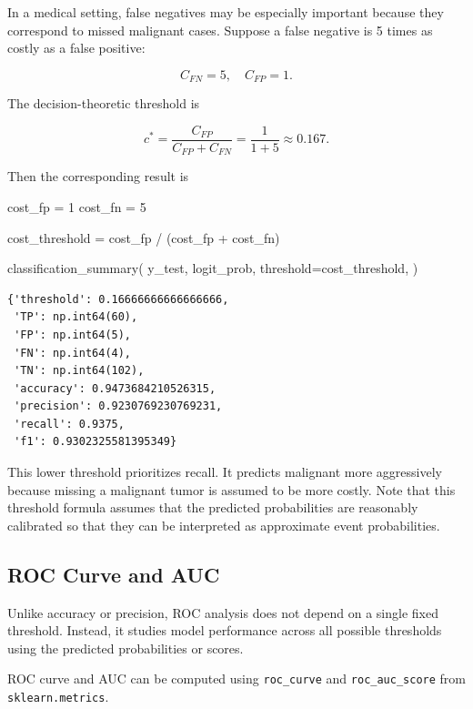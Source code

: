 \documentclass[
  letterpaper,
  DIV=11,
  numbers=noendperiod]{scrreprt}
\newenvironment{Shaded}{\begin{snugshade}}{\end{snugshade}}
\newcommand{\DecValTok}[1]{\textcolor[rgb]{0.68,0.00,0.00}{#1}}
\newcommand{\NormalTok}[1]{\textcolor[rgb]{0.00,0.23,0.31}{#1}}
\newcommand{\OperatorTok}[1]{\textcolor[rgb]{0.37,0.37,0.37}{#1}}
\theoremstyle{definition}
\theoremstyle{definition}
\theoremstyle{plain}
\theoremstyle{plain}
\theoremstyle{remark}
\begin{document}
In a medical setting, false negatives may be especially important
because they correspond to missed malignant cases. Suppose a false
negative is 5 times as costly as a false positive:

\[
C_{FN}=5,
\quad
C_{FP}=1.
\]

The decision-theoretic threshold is

\[
c^*
=
\frac{C_{FP}}{C_{FP}+C_{FN}}
=
\frac{1}{1+5}
\approx
0.167.
\]

Then the corresponding result is

\begin{Shaded}
\begin{Highlighting}[]
\NormalTok{cost\_fp }\OperatorTok{=} \DecValTok{1}
\NormalTok{cost\_fn }\OperatorTok{=} \DecValTok{5}

\NormalTok{cost\_threshold }\OperatorTok{=}\NormalTok{ cost\_fp }\OperatorTok{/}\NormalTok{ (cost\_fp }\OperatorTok{+}\NormalTok{ cost\_fn)}

\NormalTok{classification\_summary(}
\NormalTok{    y\_test,}
\NormalTok{    logit\_prob,}
\NormalTok{    threshold}\OperatorTok{=}\NormalTok{cost\_threshold,}
\NormalTok{)}
\end{Highlighting}
\end{Shaded}

\begin{verbatim}
{'threshold': 0.16666666666666666,
 'TP': np.int64(60),
 'FP': np.int64(5),
 'FN': np.int64(4),
 'TN': np.int64(102),
 'accuracy': 0.9473684210526315,
 'precision': 0.9230769230769231,
 'recall': 0.9375,
 'f1': 0.9302325581395349}
\end{verbatim}

This lower threshold prioritizes recall. It predicts malignant more
aggressively because missing a malignant tumor is assumed to be more
costly. Note that this threshold formula assumes that the predicted
probabilities are reasonably calibrated so that they can be interpreted
as approximate event probabilities.

\subsection{ROC Curve and AUC}\label{roc-curve-and-auc}

Unlike accuracy or precision, ROC analysis does not depend on a single
fixed threshold. Instead, it studies model performance across all
possible thresholds using the predicted probabilities or scores.

ROC curve and AUC can be computed using \texttt{roc\_curve} and
\texttt{roc\_auc\_score} from \texttt{sklearn.metrics}.
\end{document}
